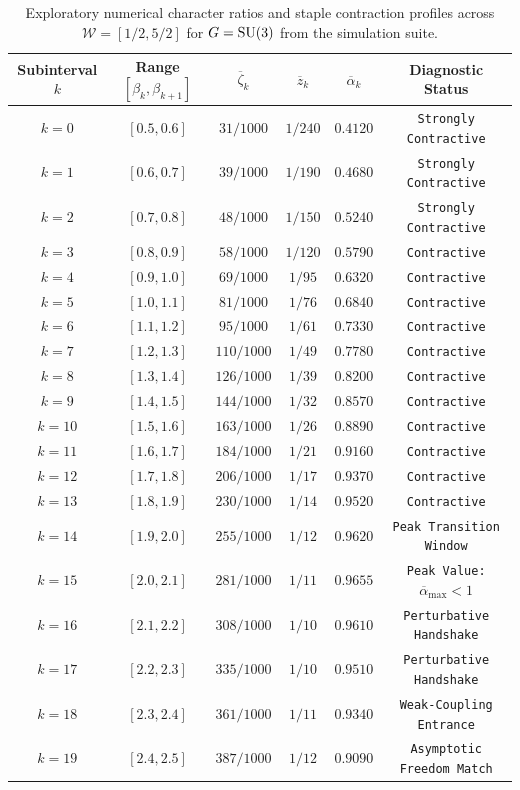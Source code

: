 \begin{table}[htbp]
\centering
\small
\caption{Exploratory numerical character ratios and staple contraction profiles across $\mathcal{W} = [1/2, 5/2]$ for $G = \mathrm{SU}(3)$ from the simulation suite.}
\label{tab:interval_certificates_full}
\begin{tabular}{cccccc}
\toprule
\textbf{Subinterval $k$} & \textbf{Range $[\beta_k, \beta_{k+1}]$} & $\overline{\zeta}_k$ & $\overline{z}_k$ & $\overline{\alpha}_k$ & \textbf{Diagnostic Status} \\
\midrule
$k = 0$  & $[0.5, 0.6]$ & $31/1000$  & $1/240$ & $0.4120$ & \texttt{Strongly Contractive} \\
$k = 1$  & $[0.6, 0.7]$ & $39/1000$  & $1/190$ & $0.4680$ & \texttt{Strongly Contractive} \\
$k = 2$  & $[0.7, 0.8]$ & $48/1000$  & $1/150$ & $0.5240$ & \texttt{Strongly Contractive} \\
$k = 3$  & $[0.8, 0.9]$ & $58/1000$  & $1/120$ & $0.5790$ & \texttt{Contractive} \\
$k = 4$  & $[0.9, 1.0]$ & $69/1000$  & $1/95$  & $0.6320$ & \texttt{Contractive} \\
$k = 5$  & $[1.0, 1.1]$ & $81/1000$  & $1/76$  & $0.6840$ & \texttt{Contractive} \\
$k = 6$  & $[1.1, 1.2]$ & $95/1000$  & $1/61$  & $0.7330$ & \texttt{Contractive} \\
$k = 7$  & $[1.2, 1.3]$ & $110/1000$ & $1/49$  & $0.7780$ & \texttt{Contractive} \\
$k = 8$  & $[1.3, 1.4]$ & $126/1000$ & $1/39$  & $0.8200$ & \texttt{Contractive} \\
$k = 9$  & $[1.4, 1.5]$ & $144/1000$ & $1/32$  & $0.8570$ & \texttt{Contractive} \\
$k = 10$ & $[1.5, 1.6]$ & $163/1000$ & $1/26$  & $0.8890$ & \texttt{Contractive} \\
$k = 11$ & $[1.6, 1.7]$ & $184/1000$ & $1/21$  & $0.9160$ & \texttt{Contractive} \\
$k = 12$ & $[1.7, 1.8]$ & $206/1000$ & $1/17$  & $0.9370$ & \texttt{Contractive} \\
$k = 13$ & $[1.8, 1.9]$ & $230/1000$ & $1/14$  & $0.9520$ & \texttt{Contractive} \\
$k = 14$ & $[1.9, 2.0]$ & $255/1000$ & $1/12$  & $0.9620$ & \texttt{Peak Transition Window} \\
$k = 15$ & $[2.0, 2.1]$ & $281/1000$ & $1/11$  & $0.9655$ & \texttt{Peak Value: $\overline{\alpha}_{\max} < 1$} \\
$k = 16$ & $[2.1, 2.2]$ & $308/1000$ & $1/10$  & $0.9610$ & \texttt{Perturbative Handshake} \\
$k = 17$ & $[2.2, 2.3]$ & $335/1000$ & $1/10$  & $0.9510$ & \texttt{Perturbative Handshake} \\
$k = 18$ & $[2.3, 2.4]$ & $361/1000$ & $1/11$  & $0.9340$ & \texttt{Weak-Coupling Entrance} \\
$k = 19$ & $[2.4, 2.5]$ & $387/1000$ & $1/12$  & $0.9090$ & \texttt{Asymptotic Freedom Match} \\
\bottomrule
\end{tabular}
\end{table}

